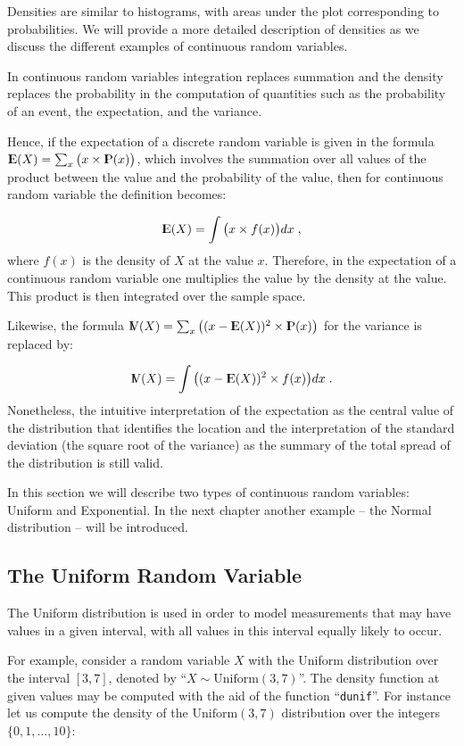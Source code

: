\documentclass[]{krantz}
\newcommand{\Expec}{{\rm I\kern-.3em E}}
\newcommand{\Prob}{{\rm I\kern-.3em P}}
\newcommand{\Var}{{\rm I\kern-.3em V}}
\theoremstyle{definition}
\theoremstyle{definition}
\theoremstyle{definition}
\theoremstyle{remark}
\begin{document}
Densities are similar to histograms, with areas under the plot
corresponding to probabilities. We will provide a more detailed
description of densities as we discuss the different examples of
continuous random variables.

In continuous random variables integration replaces summation and the
density replaces the probability in the computation of quantities such
as the probability of an event, the expectation, and the variance.

Hence, if the expectation of a discrete random variable is given in the
formula \(\Expec(X) = \sum_x \big(x \times \Prob(x)\big)\), which
involves the summation over all values of the product between the value
and the probability of the value, then for continuous random variable
the definition becomes:

\[\Expec(X) = \int \big(x \times f(x)\big)dx\;,\] where \(f(x)\) is the
density of \(X\) at the value \(x\). Therefore, in the expectation of a
continuous random variable one multiplies the value by the density at
the value. This product is then integrated over the sample space.

Likewise, the formula
\(\Var(X) = \sum_x\big( (x-\Expec(X))^2 \times \Prob(x)\big)\) for the
variance is replaced by:

\[\Var(X) =\int\big((x-\Expec(X))^2 \times f(x) \big) dx\;.\]
Nonetheless, the intuitive interpretation of the expectation as the
central value of the distribution that identifies the location and the
interpretation of the standard deviation (the square root of the
variance) as the summary of the total spread of the distribution is
still valid.

In this section we will describe two types of continuous random
variables: Uniform and Exponential. In the next chapter another example
-- the Normal distribution -- will be introduced.

\subsection{The Uniform Random
Variable}\label{the-uniform-random-variable}

The Uniform distribution is used in order to model measurements that may
have values in a given interval, with all values in this interval
equally likely to occur.

For example, consider a random variable \(X\) with the Uniform
distribution over the interval \([3,7]\), denoted by
``\(X \sim \mathrm{Uniform}(3,7)\)''. The density function at given
values may be computed with the aid of the function ``\texttt{dunif}''.
For instance let us compute the density of the \(\mathrm{Uniform}(3,7)\)
distribution over the integers \(\{0, 1, \ldots, 10\}\):
\end{document}
